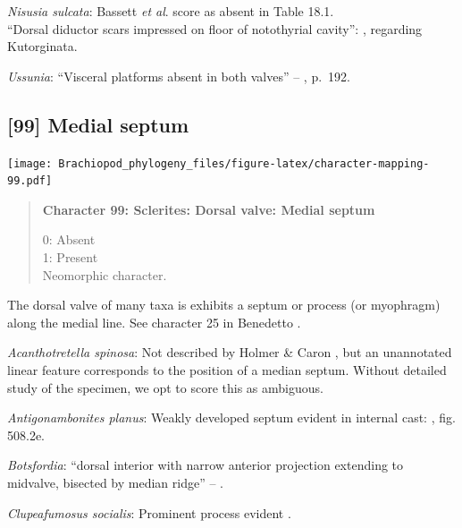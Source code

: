 \documentclass[openany]{book}
\begin{document}
\hypertarget{Nisusia_sulcata-coding-98}{}
\emph{Nisusia sulcata}: Bassett \emph{et al}.
\citeyearpar{Bassett2001Functionalmorphology} score as absent in Table
18.1.\\
``Dorsal diductor scars impressed on floor of notothyrial cavity'':
\citet{Williams2000LinguliformeaCraniiformea}, regarding Kutorginata.

\hypertarget{Ussunia-coding-98}{}
\emph{Ussunia}: ``Visceral platforms absent in both valves'' --
\citet{Williams2000LinguliformeaCraniiformea}, p.~192.

\subsection*{{[}99{]} Medial septum}\label{medial-septum}

\texttt{[image: Brachiopod\_phylogeny\_files/figure-latex/character-mapping-99.pdf]}

\begin{quote}
\textbf{Character 99: Sclerites: Dorsal valve: Medial septum}

0: Absent\\
1: Present\\
Neomorphic character.
\end{quote}

The dorsal valve of many taxa is exhibits a septum or process (or
myophragm) along the medial line. See character 25 in Benedetto
\citeyearpar{Benedetto2009iChaniella}.

\hypertarget{Acanthotretella_spinosa-coding-99}{}
\emph{Acanthotretella spinosa}: Not described by Holmer \& Caron
\citeyearpar{Holmer2006Aspinose}, but an unannotated linear feature
corresponds to the position of a median septum. Without detailed study
of the specimen, we opt to score this as ambiguous.

\hypertarget{Antigonambonites_planus-coding-99}{}
\emph{Antigonambonites planus}: Weakly developed septum evident in
internal cast: \citet{Williams2000LinguliformeaCraniiformea}, fig.
508.2e.

\hypertarget{Botsfordia-coding-99}{}
\emph{Botsfordia}: ``dorsal interior with narrow anterior projection
extending to midvalve, bisected by median ridge'' --
\citet{Williams2000LinguliformeaCraniiformea}.

\hypertarget{Clupeafumosus_socialis-coding-99}{}
\emph{Clupeafumosus socialis}: Prominent process evident
\citep{Topper2013Reappraisalof}.
\end{document}
